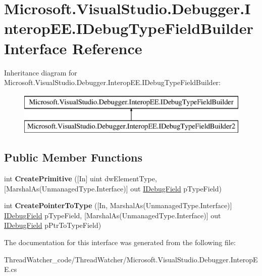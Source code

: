 \hypertarget{interface_microsoft_1_1_visual_studio_1_1_debugger_1_1_interop_e_e_1_1_i_debug_type_field_builder}{\section{Microsoft.\+Visual\+Studio.\+Debugger.\+Interop\+E\+E.\+I\+Debug\+Type\+Field\+Builder Interface Reference}
\label{interface_microsoft_1_1_visual_studio_1_1_debugger_1_1_interop_e_e_1_1_i_debug_type_field_builder}
}
Inheritance diagram for Microsoft.\+Visual\+Studio.\+Debugger.\+Interop\+E\+E.\+I\+Debug\+Type\+Field\+Builder\+:\begin{figure}[H]
\begin{center}
\leavevmode
\includegraphics[height=2.000000cm]{interface_microsoft_1_1_visual_studio_1_1_debugger_1_1_interop_e_e_1_1_i_debug_type_field_builder}
\end{center}
\end{figure}
\subsection*{Public Member Functions}
\begin{DoxyCompactItemize}
\item 
\hypertarget{interface_microsoft_1_1_visual_studio_1_1_debugger_1_1_interop_e_e_1_1_i_debug_type_field_builder_a8303f7893cb27c43e1fa1059533a17fd}{int {\bfseries Create\+Primitive} (\mbox{[}In\mbox{]} uint dw\+Element\+Type, \mbox{[}Marshal\+As(Unmanaged\+Type.\+Interface)\mbox{]} out \hyperlink{interface_microsoft_1_1_visual_studio_1_1_debugger_1_1_interop_e_e_1_1_i_debug_field}{I\+Debug\+Field} p\+Type\+Field)}\label{interface_microsoft_1_1_visual_studio_1_1_debugger_1_1_interop_e_e_1_1_i_debug_type_field_builder_a8303f7893cb27c43e1fa1059533a17fd}

\item 
\hypertarget{interface_microsoft_1_1_visual_studio_1_1_debugger_1_1_interop_e_e_1_1_i_debug_type_field_builder_a7ff8b2480585993da04759660603b196}{int {\bfseries Create\+Pointer\+To\+Type} (\mbox{[}In, Marshal\+As(Unmanaged\+Type.\+Interface)\mbox{]} \hyperlink{interface_microsoft_1_1_visual_studio_1_1_debugger_1_1_interop_e_e_1_1_i_debug_field}{I\+Debug\+Field} p\+Type\+Field, \mbox{[}Marshal\+As(Unmanaged\+Type.\+Interface)\mbox{]} out \hyperlink{interface_microsoft_1_1_visual_studio_1_1_debugger_1_1_interop_e_e_1_1_i_debug_field}{I\+Debug\+Field} p\+Ptr\+To\+Type\+Field)}\label{interface_microsoft_1_1_visual_studio_1_1_debugger_1_1_interop_e_e_1_1_i_debug_type_field_builder_a7ff8b2480585993da04759660603b196}

\end{DoxyCompactItemize}


The documentation for this interface was generated from the following file\+:\begin{DoxyCompactItemize}
\item 
Thread\+Watcher\+\_\+code/\+Thread\+Watcher/Microsoft.\+Visual\+Studio.\+Debugger.\+Interop\+E\+E.\+cs\end{DoxyCompactItemize}
